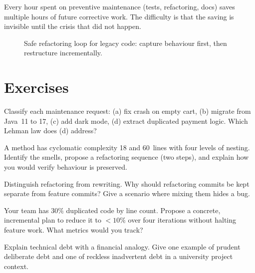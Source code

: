 \begin{remark}
Every hour spent on preventive maintenance (tests, refactoring, docs) saves multiple hours of future corrective work. The difficulty is that the saving is invisible until the crisis that did not happen.
\end{remark}

\begin{figure}[h]
\centering
{}
\caption{Safe refactoring loop for legacy code: capture behaviour first, then restructure incrementally.}
\end{figure}

\section{Exercises}

\begin{exercise}
Classify each maintenance request: (a) fix crash on empty cart, (b) migrate from Java~11 to 17, (c) add dark mode, (d) extract duplicated payment logic. Which Lehman law does (d) address?
\end{exercise}

\begin{exercise}
A method has cyclomatic complexity 18 and 60~lines with four levels of nesting. Identify the smells, propose a refactoring sequence (two steps), and explain how you would verify behaviour is preserved.
\end{exercise}

\begin{exercise}
Distinguish refactoring from rewriting. Why should refactoring commits be kept separate from feature commits? Give a scenario where mixing them hides a bug.
\end{exercise}

\begin{exercise}
Your team has $30\%$ duplicated code by line count. Propose a concrete, incremental plan to reduce it to $<10\%$ over four iterations without halting feature work. What metrics would you track?
\end{exercise}

\begin{exercise}
Explain technical debt with a financial analogy. Give one example of prudent deliberate debt and one of reckless inadvertent debt in a university project context.
\end{exercise}
